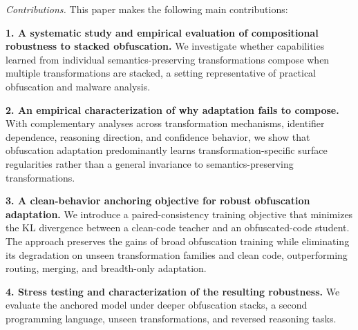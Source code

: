 {\em Contributions.} This paper makes the following main contributions:

\textbf{1. A systematic study and empirical evaluation of compositional robustness to
stacked obfuscation.}
    We investigate whether capabilities learned from individual
    semantics-preserving transformations compose when multiple
    transformations are stacked, a setting representative of practical
    obfuscation and malware analysis.

\textbf{2. An empirical characterization of why adaptation
    fails to compose.}
    With complementary analyses across transformation mechanisms,
    identifier dependence, reasoning direction, and confidence
    behavior, we show that obfuscation adaptation predominantly learns
    transformation-specific surface regularities rather than a general
    invariance to semantics-preserving transformations.

\textbf{3. A clean-behavior anchoring objective for robust
    obfuscation adaptation.}
    We introduce a paired-consistency training objective that minimizes
    the KL divergence between a clean-code teacher and an
    obfuscated-code student. The approach preserves the gains of broad
    obfuscation training while eliminating its degradation on unseen
    transformation families and clean code, outperforming routing,
    merging, and breadth-only adaptation.

\textbf{4. Stress testing and characterization of the resulting
    robustness.} We evaluate the anchored model under deeper obfuscation stacks, a
    second programming language, unseen transformations, and reversed
    reasoning tasks. 